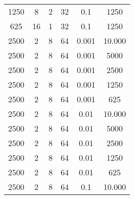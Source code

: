 \begin{tabularx}{\linewidth}{ |c|c|c|c|c|c|  }
    1250 & 8   & 2     & 32  & 0.1   & 1250                                                                                                                               \\
    625  & 16  & 1     & 32  & 0.1   & 1250                                                                                                                               \\
    \hline
    2500 & 2   & 8     & 64  & 0.001 & 10.000                                                                                                                             \\
    2500 & 2   & 8     & 64  & 0.001 & 5000                                                                                                                               \\
    2500 & 2   & 8     & 64  & 0.001 & 2500                                                                                                                               \\
    2500 & 2   & 8     & 64  & 0.001 & 1250                                                                                                                               \\
    2500 & 2   & 8     & 64  & 0.001 & 625                                                                                                                                \\
    2500 & 2   & 8     & 64  & 0.01  & 10.000                                                                                                                             \\
    2500 & 2   & 8     & 64  & 0.01  & 5000                                                                                                                               \\
    2500 & 2   & 8     & 64  & 0.01  & 2500                                                                                                                               \\
    2500 & 2   & 8     & 64  & 0.01  & 1250                                                                                                                               \\
    2500 & 2   & 8     & 64  & 0.01  & 625                                                                                                                                \\
    2500 & 2   & 8     & 64  & 0.1   & 10.000                                                                                                                             \\

\end{tabularx}
